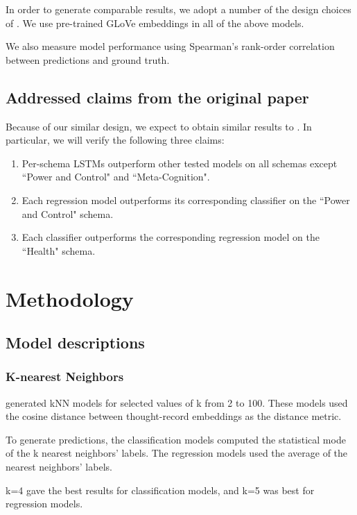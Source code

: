 \documentclass[11pt,a4paper]{article}
\begin{document}
In order to generate comparable results, we adopt a number of the design choices of \citeauthor{burger_2021}. We use pre-trained GLoVe embeddings \citep{pennington_2014} in all of the above models. 

We also measure model performance using Spearman's rank-order correlation between predictions and ground truth. 

\subsection{Addressed claims from the original paper}
\label{claims}
Because of our similar design, we expect to obtain similar results to \citeauthor{burger_2021}. In particular, we will verify the following three claims:
\begin{enumerate}
    \item Per-schema LSTMs outperform other tested models on all schemas except ``Power and Control" and ``Meta-Cognition".
    \label{claim1}
    \item Each regression model outperforms its corresponding classifier on the ``Power and Control" schema.
    \label{claim2}
    \item Each classifier outperforms the corresponding regression model on the ``Health" schema.
    \label{claim3}
\end{enumerate}

\section{Methodology}
\subsection{Model descriptions}
\subsubsection{K-nearest Neighbors}
\citeauthor{burger_2021} generated kNN models for selected values of k from 2 to 100. These models used the cosine distance between thought-record embeddings as the distance metric.

To generate predictions, the classification models computed the statistical mode of the k nearest neighbors' labels. The regression models used the average of the nearest neighbors' labels.

k=4 gave the best results for classification models, and k=5 was best for regression models.
\end{document}
